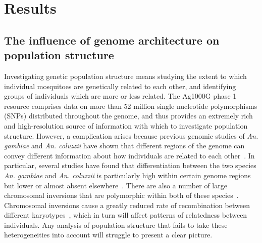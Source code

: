 \documentclass[a4paper,11pt,abstracton,hidelinks]{scrartcl}
\begin{document}
\section{Results}\label{sec:results}


\subsection{The influence of genome architecture on population structure}\label{subsec:treescan}


Investigating genetic population structure means studying the extent to which individual mosquitoes are genetically related to each other, and identifying groups of individuals which are more or less related.
%
The Ag1000G phase 1 resource comprises data on more than 52 million single nucleotide polymorphisms (SNPs) distributed throughout the genome, and thus provides an extremely rich and high-resolution source of information with which to investigate population structure.
%
However, a complication arises because previous genomic studies of \textit{An. gambiae} and \textit{An. coluzzii} have shown that different regions of the genome can convey different information about how individuals are related to each other~\parencite{Fontaine2014}.
%
In particular, several studies have found that differentiation between the two species \textit{An. gambiae} and \textit{An. coluzzii} is particularly high within certain genome regions but lower or almost absent elsewhere~\parencite{Turner2005,White2010,Weetman2012,Cruickshank2014}.
%
There are also a number of large chromosomal inversions that are polymorphic within both of these species~\parencite{dellaTorre2001,Coluzzi2002}.
%
Chromosomal inversions cause a greatly reduced rate of recombination between different karyotypes~\parencite{Stump2007}, which in turn will affect patterns of relatedness between individuals.
%
Any analysis of population structure that fails to take these heterogeneities into account will struggle to present a clear picture.
\end{document}

